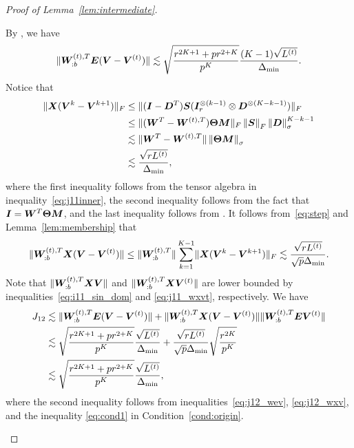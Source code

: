 \documentclass[lettersize,onecolumn,journal]{IEEEtran}
\theoremstyle{definition}
\theoremstyle{definition}
\begin{document}
\begin{proof}[Proof of Lemma~\ref{lem:intermediate}]
\begin{enumerate}[wide]
    By \citet[Proof of Lemma 5]{han2020exact}, we have 
    \begin{equation}\label{eq:j12_wev}
        \onormSize{}{\mW_{:b}^{(t),T} \mE (\mV-\mV^{(t)})} \lesssim \sqrt{ \frac{r^{2K+1} + p r^{2 + K}}{p^K} } \frac{(K-1)\sqrt{L^{(t)}}}{\Delta_{\min}}.
    \end{equation}
    Notice that 
    \begin{align}\label{eq:step}
        \onormSize{}{\mX (\mV^k-\mV^{k+1})}_F &\leq \onormSize{}{(\mI - \mD^T) \mS (\mI_r^{\otimes (k-1)} \otimes  \mD^{\otimes (K-k-1)})}_F\notag \\
        &\leq \onormSize{}{(\mW^T - \mW^{(t),T}) \mTheta \mM}_F \onorm{\mS}_F \onorm{ \mD}_{\sigma}^{K-k-1}\notag \\
        & \lesssim \onormSize{}{ \mW^T - \mW^{(t),T} } \onorm{\mTheta \mM}_{\sigma} \notag\\
        & \lesssim \frac{ \sqrt{r L^{(t)}}}{\Delta_{\min}},
    \end{align}
    where the first inequality follows from the tensor algebra in 
    inequality~\eqref{eq:j11inner}, the second inequality follows from the fact  that $\bm I = \bm{W}^T \boldsymbol{\Theta} \bm M$, and the last inequality follows from \citet[Proof of Lemma 5]{han2020exact}. It follows from~\eqref{eq:step} and Lemma~\ref{lem:membership} that
    \begin{equation}
           \onormSize{}{\mW_{:b}^{(t),T} \mX (\mV-\mV^{(t)})}\leq \onormSize{}{\mW_{:b}^{(t),T} }  \sum_{k = 1}^{K-1} \onormSize{}{\mX (\mV^k-\mV^{k+1})}_F \lesssim \frac{ \sqrt{r L^{(t)}}}{\sqrt{p} \Delta_{\min}}.\label{eq:j12_wxv}
    \end{equation}
    Note that $\lVert\bm{W}_{:b}^{(t),T} \bm X \bm{V} \rVert$ and $\lVert\bm{W}_{:b}^{(t),T} \bm X \bm{V}^{(t)} \rVert$ are lower bounded by inequalities~\eqref{eq:i11_sin_dom} and \eqref{eq:j11_wxvt}, respectively. We have 
    \begin{align}
        J_{12} &\lesssim \lVert\bm{W}_{:b}^{(t),T} \bm{E} (\bm{V}-\bm{V}^{(t)})\rVert + \lVert\bm{W}_{:b}^{(t),T} \bm X (\bm{V}-\bm{V}^{(t)})\rVert\lVert\bm{W}_{:b}^{(t),T} \bm{E} \bm{V}^{(t)} \rVert\\
        &\lesssim \sqrt{ \frac{r^{2K+1} + p r^{2 + K}}{p^K} } \frac{\sqrt{L^{(t)}}}{\Delta_{\min}} + \frac{ \sqrt{r L^{(t)}}}{\sqrt{p} \Delta_{\min}} \sqrt{\frac{r^{2K}}{p^K}} \\
        & \lesssim  \sqrt{ \frac{r^{2K+1} + p r^{2 + K}}{p^K} } \frac{\sqrt{L^{(t)}}}{\Delta_{\min}},
    \end{align}
    where the second inequality follows from inequalities~\eqref{eq:j12_wev}, \eqref{eq:j12_wxv}, and the inequality \eqref{eq:cond1} in Condition~\ref{cond:origin}.
    

\end{enumerate}
\end{proof}
\end{document}
